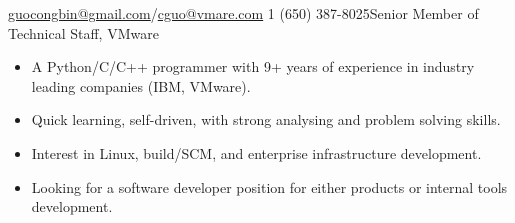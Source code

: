 \documentclass[10pt,letterpaper]{article}
\begin{document}
 



\noindent\href{mailto:guocongbin@gmail.com}{guocongbin@gmail.com}/\href{mailto:cguo@vmware.com}{cguo@vmare.com}\bull
\textsmaller{+}1 (650) 387-8025\bull Senior Member of Technical Staff, VMware

\spacedhrule{0.5em}{-0.4em} %




\begin{itemize}
    \itemsep0em
    \item A Python/C/C++ programmer with 9+ years of experience in industry
        leading companies (IBM, VMware).
    \item Quick learning, self-driven, with strong analysing and problem solving
        skills.
    \item Interest in Linux, build/SCM, and enterprise infrastructure
        development.
    \item Looking for a software developer position for either products or
        internal tools development.
\end{itemize}

\spacedhrule{0.5em}{-0.4em} %

\end{document}
